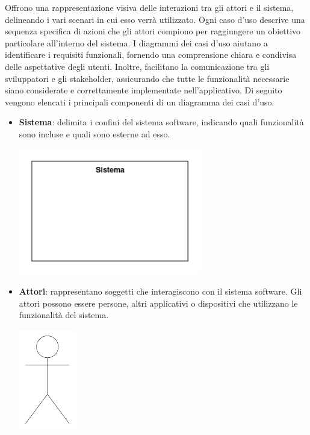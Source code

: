 Offrono una rappresentazione visiva delle interazioni tra gli attori e il sistema, delineando i vari scenari in cui esso verrà utilizzato. Ogni caso d'uso descrive una sequenza specifica di azioni che gli attori compiono per raggiungere un obiettivo particolare all'interno del sistema. I diagrammi dei casi d'uso aiutano a identificare i requisiti funzionali, fornendo una comprensione chiara e condivisa delle aspettative degli utenti. Inoltre, facilitano la comunicazione tra gli sviluppatori e gli stakeholder, assicurando che tutte le funzionalità necessarie siano considerate e correttamente implementate nell'applicativo.
Di seguito vengono elencati i principali componenti di un diagramma dei casi d'uso.
\begin{itemize}
	\item \textbf{Sistema}: delimita i confini del sistema software, indicando quali funzionalità sono incluse e quali sono esterne ad esso.
	      \begin{center}
		      \includegraphics*[width=8cm]{../../../images/norme_di_progetto/sistema.png}
	      \end{center}
	\item \textbf{Attori}: rappresentano soggetti che interagiscono con il sistema software. Gli attori possono essere persone, altri applicativi o dispositivi che utilizzano le funzionalità del sistema.
	      \begin{center}
		      \includegraphics*[width=2.5cm]{../../../images/norme_di_progetto/attore.png}

\end{center}
\end{itemize}
